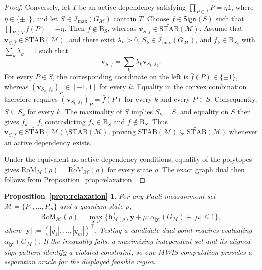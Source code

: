 \documentclass[10pt,aps,pra,twocolumn,floatfix,nofootinbib,superscriptaddress,longbibliography]{revtex4-2}
\newcommand{\Mcal}{\mathcal M}
\newcommand{\STAB}{\mathrm{STAB}}
\newcommand{\RoM}{\mathrm{RoM}}
\newcommand{\Ind}{\mathcal I}
\newcommand{\Bset}{\mathrm B}
\providecommand{\mathbm}[1]{\bm{#1}}
\newtheorem*{propRelaxationRestatement}{Proposition~\ref{prop:relaxation}}
\begin{document}
\begin{bibunit}[apsrev4-2]
\begin{proof}
			Conversely, let $T$ be an active dependency satisfying $\prod_{P\in T}P=\eta\mathbb{1}$, where $\eta\in\{\pm1\}$, and let $S\in\Ind_{\max}(G_\Mcal)$ contain $T$.
			Choose $\bar f\in\mathsf{Sign}(S)$ such that $\prod_{P\in T}\bar f(P)=-\eta$. Then $\bar f\notin\Bset_S$, whereas $\mathbm{v}_{S,\bar f}\in\widetilde{\STAB}(\Mcal)$.
			Assume that $\mathbm{v}_{S,\bar f}\in\STAB(\Mcal)$, and there exist $\lambda_k>0$, $S_k\in\Ind_{\max}(G_\Mcal)$, and $f_k\in\Bset_{S_k}$ with $\sum_k\lambda_k=1$ such that
			\begin{equation*}
				\mathbm{v}_{S,\bar f}=\sum_k\lambda_k\mathbm{v}_{S_k,f_k}.
			\end{equation*}
			For every $P\in S$, the corresponding coordinate on the left is $\bar f(P)\in\{\pm1\}$, whereas $(\mathbm{v}_{S_k,f_k})_P\in[-1,1]$ for every $k$. Equality in the convex combination therefore requires $(\mathbm{v}_{S_k,f_k})_P=\bar f(P)$ for every $k$ and every $P\in S$.
			Consequently, $S\subseteq S_k$ for every $k$. The maximality of $S$ implies $S_k=S$, and equality on $S$ then gives $f_k=\bar f$, contradicting $f_k\in\Bset_S$ and $\bar f\notin\Bset_S$.
			Thus $\mathbm{v}_{S,\bar f}\in\widetilde{\STAB}(\Mcal)\setminus\STAB(\Mcal)$, proving $\STAB(\Mcal)\subsetneq\widetilde{\STAB}(\Mcal)$ whenever an active dependency exists.
			
			Under the equivalent no active dependency conditions, equality of the polytopes gives $\RoM_\Mcal(\rho)=\widetilde{\RoM}_\Mcal(\rho)$ for every state $\rho$.
			The exact graph dual then follows from Proposition~\ref{prop:relaxation}.
		\end{proof}
		
		\begin{propRelaxationRestatement}
			
			For any Pauli measurement set $\Mcal=\{P_1,\dots,P_m\}$ and a quantum state $\rho$,
			\begin{equation}
				\widetilde{\RoM}_\Mcal(\rho)=\max_{\mathbm{y},\mu}\Big\{\mathbm{b}_{\Mcal(\rho)}^\top \mathbm{y}+\mu: \alpha_{|\mathbm{y}|}(G_\Mcal)+|\mu|\le 1\Big\},
				\label{eq:dual-relaxed-app}
			\end{equation}
			where $|\mathbm{y}|:=(|y_1|,\dots,|y_m|)^\top$. Testing a candidate dual point requires evaluating $\alpha_{|\mathbm{y}|}(G_\Mcal)$. If the inequality fails, a maximizing independent set and its aligned sign pattern identify a violated constraint, so one MWIS computation provides a separation oracle for the displayed feasible region.
		\end{propRelaxationRestatement}
		

\end{bibunit}
\end{document}
